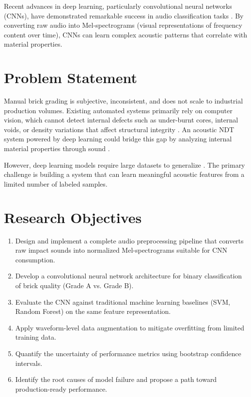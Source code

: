 \documentclass[12pt,a4paper,oneside]{report}
\begin{document}
Recent advances in deep learning, particularly convolutional neural networks (CNNs), have demonstrated remarkable success in audio classification tasks \cite{sbcnn2016,dennis2014}. By converting raw audio into Mel-spectrograms (visual representations of frequency content over time), CNNs can learn complex acoustic patterns that correlate with material properties.

\section{Problem Statement}

Manual brick grading is subjective, inconsistent, and does not scale to industrial production volumes. Existing automated systems primarily rely on computer vision, which cannot detect internal defects such as under-burnt cores, internal voids, or density variations that affect structural integrity \cite{marhoon2015}. An acoustic NDT system powered by deep learning could bridge this gap by analyzing internal material properties through sound \cite{rotor2023,kim2025}.

However, deep learning models require large datasets to generalize \cite{sbcnn2016,zhang2019}. The primary challenge is building a system that can learn meaningful acoustic features from a limited number of labeled samples.

\section{Research Objectives}

\begin{enumerate}
    \item Design and implement a complete audio preprocessing pipeline that converts raw impact sounds into normalized Mel-spectrograms suitable for CNN consumption.
    \item Develop a convolutional neural network architecture for binary classification of brick quality (Grade A vs. Grade B).
    \item Evaluate the CNN against traditional machine learning baselines (SVM, Random Forest) on the same feature representation.
    \item Apply waveform-level data augmentation to mitigate overfitting from limited training data.
    \item Quantify the uncertainty of performance metrics using bootstrap confidence intervals.
    \item Identify the root causes of model failure and propose a path toward production-ready performance.
\end{enumerate}
\end{document}
